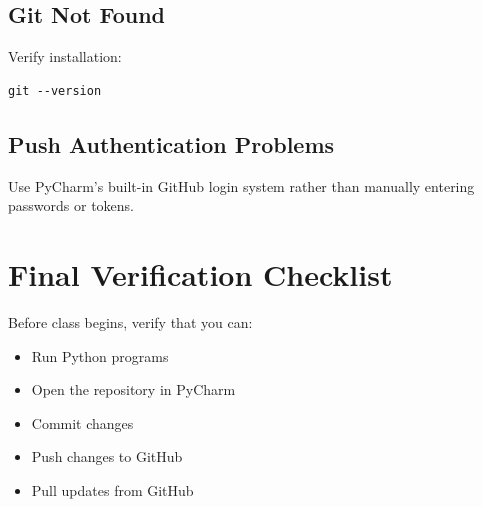 \documentclass[11pt]{article}
\begin{document}
\subsection{Git Not Found}

Verify installation:

\begin{lstlisting}
git --version
\end{lstlisting}

\subsection{Push Authentication Problems}

Use PyCharm's built-in GitHub login system rather than manually entering passwords or tokens.

\section{Final Verification Checklist}

Before class begins, verify that you can:

\begin{itemize}
    \item Run Python programs
    \item Open the repository in PyCharm
    \item Commit changes
    \item Push changes to GitHub
    \item Pull updates from GitHub
\end{itemize}
\end{document}
